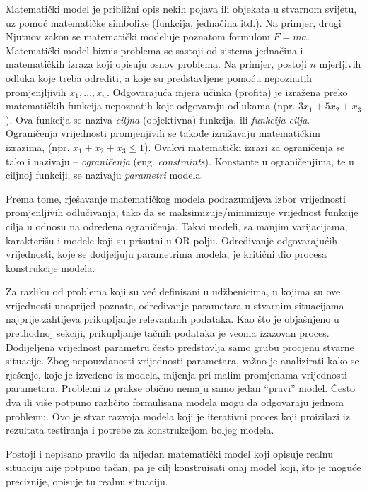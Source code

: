 \documentclass[a4paper, utf8, 11pt, colorlinks]{book}
\theoremstyle{definition}
\begin{document}
Matematički model je približni opis nekih pojava ili objekata u stvarnom svijetu, uz pomoć matematičke simbolike (funkcija, jednačina itd.). Na primjer, drugi Njutnov zakon se matematički modeluje poznatom formulom $F=ma$. Matematički model biznis problema   
se sastoji od sistema jednačina i matematičkih izraza koji opisuju osnov problema. Na primjer, postoji $n$ mjerljivih odluka koje treba odrediti, a koje su predstavljene pomoću nepoznatih promjenjljivih $x_1,\ldots, x_n$.  Odgovarajuća mjera učinka (profita) je izražena preko matematičkih funkcija nepoznatih koje odgovaraju  odlukama (npr. $3x_1 + 5x_2 + x_3$). Ova funkcija se naziva \emph{ciljna} (objektivna) funkcija, ili \emph{funkcija cilja}. Ograničenja  vrijednosti promjenjivih se takođe izražavaju matematičkim izrazima, (npr. $x_1 + x_2 + x_3 \leq 1$).  Ovakvi matematički izrazi za ograničenja se tako i nazivaju -- \emph{ograničenja} (eng. \emph{constraints}). Konstante u ograničenjima, te u ciljnoj funkciji, se nazivaju \emph{parametri} modela.

Prema tome, rješavanje matematičkog modela 
podrazumijeva izbor vrijednosti promjenljivih odlučivanja, tako da se maksimizuje/minimizuje vrijednost funkcije cilja u odnosu na određena ograničenja. Takvi modeli, sa manjim varijacijama, karakterišu i modele koji su prisutni u OR polju. 
Određivanje odgovarajućih vrijednosti, koje se dodjeljuju parametrima modela, je kritični dio procesa konstrukcije modela.

Za razliku od problema koji su već definisani u udžbenicima, u kojima su ove vrijednosti unaprijed poznate,   određivanje parametara u stvarnim situacijama najprije zahtijeva prikupljanje relevantnih podataka. Kao što je objašnjeno u prethodnoj sekciji,  prikupljanje tačnih podataka je veoma izazovan proces. Dodijeljena vrijednost parametru često predstavlja  samo grubu procjenu stvarne situacije. Zbog nepouzdanosti vrijednosti parametara, važno je analizirati kako se rješenje, koje je izvedeno iz modela, mijenja pri malim promjenama vrijednosti parametara. 
 Problemi iz prakse obično nemaju samo jedan ``pravi'' model. Često   dva ili više potpuno različito formulisana modela mogu da odgovaraju jednom problemu. 
Ovo je stvar razvoja modela koji je iterativni proces koji proizilazi iz rezultata testiranja i potrebe za konstrukcijom boljeg modela.

Postoji i nepisano pravilo da nijedan matematički model koji opisuje realnu situaciju nije potpuno tačan, pa je cilj konstruisati onaj model koji,  što je moguće preciznije, opisuje tu realnu situaciju.
\end{document}
